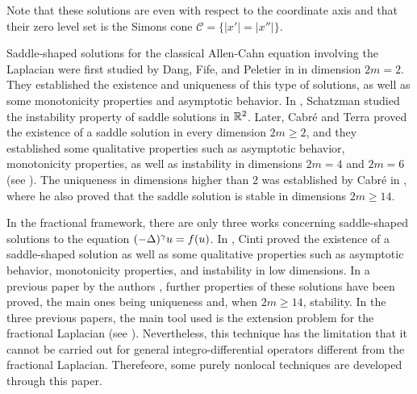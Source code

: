 Note that these solutions are even with respect to the coordinate axis and that their zero level set is the Simons cone $\mathscr{C} = \{|x'|=|x''|\}$. 

%

Saddle-shaped solutions for the classical Allen-Cahn equation involving the Laplacian were first studied by Dang, Fife, and Peletier in \cite{DangFifePeletier} in dimension $2m=2$. They established the existence and uniqueness of this type of solutions, as well as some monotonicity properties and asymptotic behavior. In \cite{Schatzman}, Schatzman studied the instability property of saddle solutions in $\mathbb{R}^2$. Later, Cabré and Terra  proved the existence of a saddle solution in every dimension $2m\geq 2$, and they established some qualitative properties such as asymptotic behavior, monotonicity properties, as well as instability in dimensions $2m = 4$ and $2m = 6$ (see \cite{CabreTerraI,CabreTerraII}). The uniqueness in dimensions higher than $2$ was established by Cabré in \cite{Cabre-Saddle}, where he also proved that the saddle solution is stable in dimensions $2m \geq 14$.

In the fractional framework, there are only three works concerning saddle-shaped solutions to the equation $(-\Delta)^\gamma u = f(u)$. In  \cite{Cinti-Saddle,Cinti-Saddle2}, Cinti proved the existence of a saddle-shaped solution as well as some qualitative properties such as asymptotic behavior, monotonicity properties, and instability in low dimensions. In a previous paper by the authors \cite{Felipe-Sanz-Perela:SaddleFractional}, further properties of these solutions have been proved, the main ones being uniqueness and, when $2m\geq 14$, stability. In the three previous papers, the main tool used is the extension problem for the fractional Laplacian (see \cite{CaffarelliSilvestre}). Nevertheless, this technique has the limitation that it cannot be carried out for general integro-differential operators different from the fractional Laplacian. Therefeore, some purely nonlocal techniques are developed through this paper.





